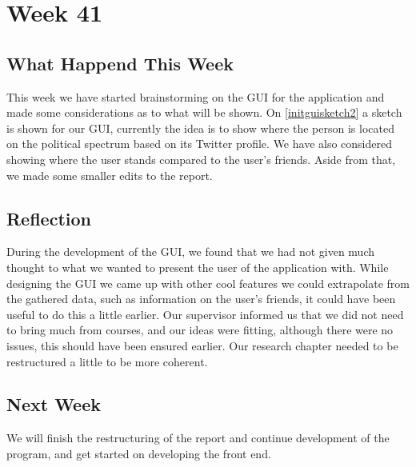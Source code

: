 \section*{Week 41}\label{week41}
\subsection*{What Happend This Week}
This week we have started brainstorming on the \ac{GUI} for the application and
made some considerations as to what will be shown. On \autoref{initguisketch2} a
sketch is shown for our \ac{GUI}, currently the idea is to show where the person is
located on the political spectrum based on its Twitter profile. We have also
considered showing where the user stands compared to the user's friends. Aside
from that, we made some smaller edits to the report.



\subsection*{Reflection} 
During the development of the \ac{GUI}, we found that
we had not given much thought to what we wanted to present the user of the
application with. While designing the \ac{GUI} we came up with other cool
features we could extrapolate from the gathered data, such as information on the
user's friends, it could have been useful to do this a little earlier. Our
supervisor informed us that we did not need to bring much from courses, and our
ideas were fitting, although there were no issues, this should have been ensured
earlier. Our research chapter needed to be restructured a little to be more
coherent.


\subsection*{Next Week}
We will finish the restructuring of the report and continue development of the
program, and get started on developing the front end.



% 
% 
% 
